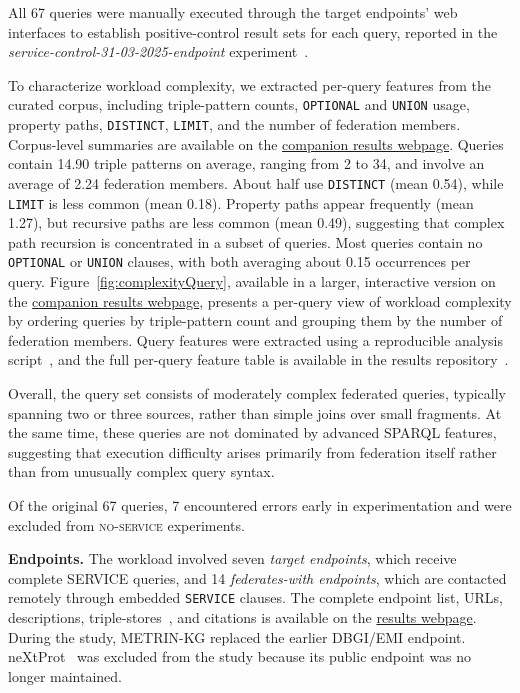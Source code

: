\documentclass[runningheads]{llncs}
\begin{document}
All 67 queries were manually executed through the target endpoints' web interfaces to establish positive-control result sets for each query, reported in the \textit{service-control-31-03-2025-endpoint} experiment~\cite{fedSurveyResultsRepo}.

To characterize workload complexity, we extracted per-query features from the curated corpus, including triple-pattern counts, \texttt{OPTIONAL} and \texttt{UNION} usage, property paths, \texttt{DISTINCT}, \texttt{LIMIT}, and the number of federation members. 
Corpus-level summaries are available on the \href{https://ecrum19.github.io/fed-survey-results/}{companion results webpage}. 
Queries contain 14.90 triple patterns on average, ranging from 2 to 34, and involve an average of 2.24 federation members. 
About half use \texttt{DISTINCT} (mean 0.54), while \texttt{LIMIT} is less common (mean 0.18). 
Property paths appear frequently (mean 1.27), but recursive paths are less common (mean 0.49), suggesting that complex path recursion is concentrated in a subset of queries. 
Most queries contain no \texttt{OPTIONAL} or \texttt{UNION} clauses, with both averaging about 0.15 occurrences per query.
Figure~\ref{fig:complexityQuery}, available in a larger, interactive version on the \href{https://ecrum19.github.io/fed-survey-results/}{companion results webpage}, presents a per-query view of workload complexity by ordering queries by triple-pattern count and grouping them by the number of federation members.
Query features were extracted using a reproducible analysis script~\cite{queryAnalysisSibFederatedRepo}, and the full per-query feature table is available in the results repository~\cite{fedSurveyResultsRepo}.

Overall, the query set consists of moderately complex federated queries, typically spanning two or three sources, rather than simple joins over small fragments. 
At the same time, these queries are not dominated by advanced SPARQL features, suggesting that execution difficulty arises primarily from federation itself rather than from unusually complex query syntax.



Of the original 67 queries, 7 encountered errors early in experimentation and were excluded from \textsc{no-service} experiments.

\textbf{Endpoints.}
The workload involved seven \textit{target endpoints}, which receive complete \textsc{SERVICE} queries, and 14 \textit{federates-with endpoints}, which are contacted remotely through embedded \texttt{SERVICE} clauses. 
The complete endpoint list, URLs, descriptions, triple-stores~\cite{Erling2009VirtuosoRDF,bast2017qlever}, and citations is available on the \href{https://ecrum19.github.io/fed-survey-results/}{results webpage}. 
During the study, METRIN-KG replaced the earlier DBGI/EMI endpoint.
neXtProt~\cite{ZahnZabal2020neXtProt} was excluded from the study because its public endpoint was no longer maintained.
\end{document}
